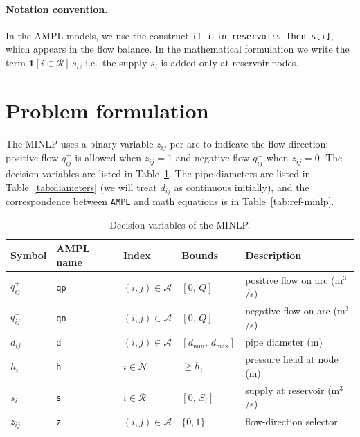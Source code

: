 \documentclass[11pt]{article}
\newcommand{\ampl}[1]{\texttt{#1}}
\newcommand{\qp}{q^{+}}
\newcommand{\qn}{q^{-}}
\begin{document}
\paragraph{Notation convention.}
In the AMPL models, we use the construct \ampl{if i in reservoirs then s[i]},
which appears in the flow balance.  In the mathematical formulation we write the term
$\mathbf{1}[i\in\mathcal{R}]\,s_i$, i.e.\ the supply $s_i$ is added only at
reservoir nodes.

\clearpage
\section{Problem formulation}
\label{sec:minlp}

The MINLP uses a binary variable $z_{ij}$ per arc to indicate the flow direction:
positive flow $\qp_{ij}$ is allowed when $z_{ij}=1$ and negative flow $\qn_{ij}$
when $z_{ij}=0$.  The decision variables are listed in Table~\ref{tab:vars-minlp}. The pipe diameters are listed in Table~\ref{tab:diameters} (we will treat $d_{ij}$ as continuous initially), and the correspondence between {\tt AMPL} and math equations is in Table~\ref{tab:ref-minlp}.

\begin{table}[htbp]
  \centering
  \caption{Decision variables of the MINLP.}
  \label{tab:vars-minlp}
  \begin{tabular}{l l l l l}
    \toprule
    Symbol & AMPL name & Index & Bounds & Description \\
    \midrule
    $\qp_{ij}$ & \ampl{qp} & $(i,j)\in\mathcal{A}$ & $[0,\,Q]$ & positive flow on arc (m$^3$/s) \\
    $\qn_{ij}$ & \ampl{qn} & $(i,j)\in\mathcal{A}$ & $[0,\,Q]$ & negative flow on arc (m$^3$/s) \\
    $d_{ij}$  & \ampl{d}  & $(i,j)\in\mathcal{A}$ & $[d_{\min},\,d_{\max}]$ & pipe diameter (m) \\
    $h_i$     & \ampl{h}  & $i\in\mathcal{N}$     & $\ge \underline{h}_i$ & pressure head at node (m) \\
    $s_i$     & \ampl{s}  & $i\in\mathcal{R}$     & $[0,\,S_i]$ & supply at reservoir (m$^3$/s) \\
    $z_{ij}$  & \ampl{z}  & $(i,j)\in\mathcal{A}$ & $\{0,1\}$ & flow-direction selector \\
    \bottomrule
  \end{tabular}
\end{table}
\end{document}
